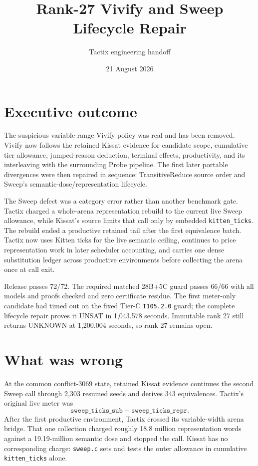 \documentclass[11pt]{article}
\title{Rank-27 Vivify and Sweep Lifecycle Repair}
\author{Tactix engineering handoff}
\date{21 August 2026}
\newcommand{\code}[1]{\texttt{#1}}
\begin{document}
\maketitle

\section*{Executive outcome}
The suspicious variable-range Vivify policy was real and has been removed.
Vivify now follows the retained Kissat evidence for candidate scope, cumulative
tier allowance, jumped-reason deduction, terminal effects, productivity, and
its interleaving with the surrounding Probe pipeline.  The first later portable
divergences were then repaired in sequence: TransitiveReduce source order and
Sweep's semantic-dose/representation lifecycle.

The Sweep defect was a category error rather than another benchmark gate.
Tactix charged a whole-arena representation rebuild to the current live Sweep
allowance, while Kissat's source limits that call only by embedded
\code{kitten\_ticks}.  The rebuild ended a productive retained tail after the
first equivalence batch.  Tactix now uses Kitten ticks for the live semantic
ceiling, continues to price representation work in later scheduler accounting,
and carries one dense substitution ledger across productive environments before
collecting the arena once at call exit.

Release passes 72/72.  The required matched 28B+5C guard passes 66/66 with all
models and proofs checked and zero certificate residue.  The first meter-only
candidate had timed out on the fixed Tier-C \code{T105.2.0} guard; the complete
lifecycle repair proves it UNSAT in 1,043.578 seconds.  Immutable rank 27 still
returns UNKNOWN at 1,200.004 seconds, so rank 27 remains open.

\section*{What was wrong}
At the common conflict-3069 state, retained Kissat evidence continues the
second Sweep call through 2,303 resumed seeds and derives 343 equivalences.
Tactix's original live meter was
\[
  \texttt{sweep\_ticks\_sub}+\texttt{sweep\_ticks\_repr}.
\]
After the first productive environment, Tactix crossed its variable-width
arena bridge.  That one collection charged roughly 18.8 million representation
words against a 19.19-million semantic dose and stopped the call.  Kissat has
no corresponding charge: \code{sweep.c} sets and tests the outer allowance in
cumulative \code{kitten\_ticks} alone.
\end{document}
